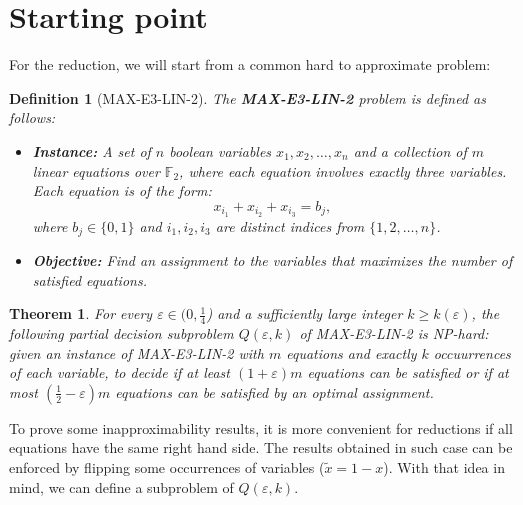 \documentclass[12pt]{article}
\newtheorem{definition}{Definition}
\newtheorem{theorem}{Theorem}
\begin{document}
\section{Starting point}
For the reduction, we will start from a common hard to approximate problem: 
\begin{definition}[MAX-E3-LIN-2]
    The \textbf{MAX-E3-LIN-2} problem is defined as follows:
    \begin{itemize}
        \item \textbf{Instance:} A set of $n$ boolean variables $x_1, x_2, \ldots, x_n$ and a collection of $m$ linear equations over $\mathbb{F}_2$, where each equation involves exactly three variables. Each equation is of the form:
        \begin{equation}
            x_{i_1} + x_{i_2} + x_{i_3} = b_j,
        \end{equation}
        where $b_j \in \{0, 1\}$ and $i_1, i_2, i_3$ are distinct indices from $\{1, 2, \ldots, n\}$.
        \item \textbf{Objective:} Find an assignment to the variables that maximizes the number of satisfied equations.
    \end{itemize}
\end{definition}
\begin{theorem}
For every $\varepsilon \in (0,\frac{1}{4}$) and a sufficiently large integer $k\geq k(\varepsilon)$, the following partial decision subproblem $Q(\varepsilon, k)$ of MAX-E3-LIN-2 is NP-hard:
given an instance of MAX-E3-LIN-2 with $m$ equations and exactly $k$ occuurrences of each variable, to decide if at least $(1 + \varepsilon)m$ equations can be satisfied or if at most $(\frac{1}{2} - \varepsilon)m$ equations can be satisfied by an optimal assignment.
\end{theorem}
To prove some  inapproximability results, it is more convenient for reductions if all equations have the same right hand side. The results obtained in such case can be enforced by flipping some occurrences of variables ($\tilde{x}= 1-x$). 
With that idea in mind, we can define a subproblem of $Q(\varepsilon, k)$. 
\end{document}
